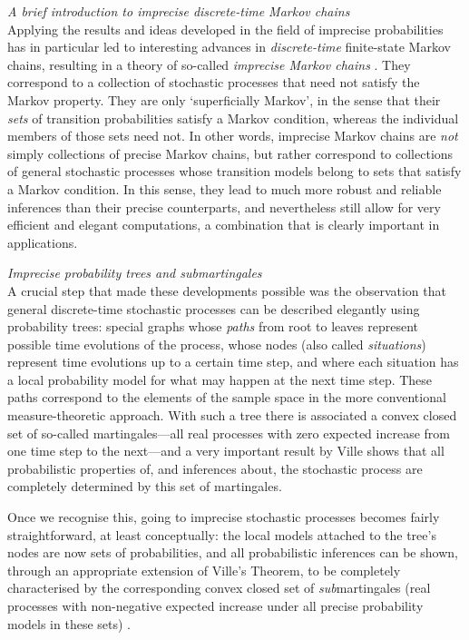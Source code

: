 \documentclass[11pt,dvipsnames,usenames,a4paper]{article}
\begin{document}
\emph{A brief introduction to imprecise discrete-time Markov chains}\\[5pt]
Applying the results and ideas developed in the field of imprecise probabilities has in particular led to interesting advances in \emph{discrete-time} finite-state Markov chains, resulting in a theory of so-called \emph{imprecise Markov chains} \cite{cooman2008,hermans2012,hartfiel1998,skulj2013,cooman2015:markovergodic}.
They correspond to a collection of stochastic processes that need not satisfy the Markov property.
They are only `superficially Markov', in the sense that their \emph{sets} of transition probabilities satisfy a Markov condition, whereas the individual members of those sets need not.
In other words, imprecise Markov chains are \emph{not} simply collections of precise Markov chains, but rather correspond to collections of general stochastic processes whose transition models belong to sets that satisfy a Markov condition.
In this sense, they lead to much more robust and reliable inferences than their precise counterparts, and nevertheless still allow for very efficient and elegant computations, a combination that is clearly important in applications.

\emph{Imprecise probability trees and submartingales}\\[5pt]
A crucial step that made these developments possible was the observation that general discrete-time stochastic processes can be described elegantly using probability trees: special graphs whose \emph{paths} from root to leaves represent possible time evolutions of the process, whose nodes (also called \emph{situations}) represent time evolutions up to a certain time step, and where each situation has a local probability model for what may happen at the next time step.
These paths correspond to the elements of the sample space in the more conventional measure-theoretic approach.
With such a tree there is associated a convex closed set of so-called martingales---all real processes with zero expected increase from one time step to the next---and a very important result by Ville \cite{ville1939,shafer2001} shows that all probabilistic properties of, and inferences about, the stochastic process are completely determined by this set of martingales.

Once we recognise this, going to imprecise stochastic processes becomes fairly straightforward, at least conceptually: the local models attached to the tree's nodes are now sets of probabilities, and all probabilistic inferences can be shown, through an appropriate extension of Ville's Theorem, to be completely characterised by the corresponding convex closed set of \emph{sub}martingales (real processes with non-negative expected increase under all precise probability models in these sets) \cite{cooman2007d,cooman2015:markovergodic}.
\end{document}
